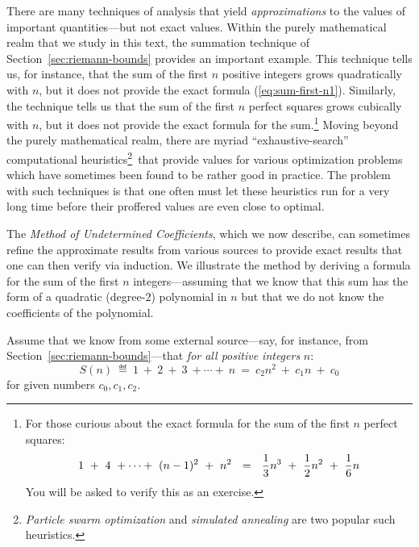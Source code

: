 \medskip


There are many techniques of analysis that yield {\em approximations} to the values of important quantities---but not exact values.  Within the purely mathematical realm that we study in this text, the summation technique of Section~\ref{sec:riemann-bounds} provides an important example.  This technique tells us, for instance, that the sum of the first $n$ positive integers grows quadratically with $n$, but it does not provide the exact formula (\ref{eq:sum-first-n1}).   Similarly, the technique tells us that the sum of the first $n$ perfect squares grows cubically with $n$, but it does not provide the exact formula for the sum.\footnote{For those curious about the exact formula for the sum of the first $n$ perfect squares:
\begin{equation}
\label{eq:sum-1-to-nsq1}
1 \ + \ 4 \ + \cdots + \ (n-1)^2 \ + \ n^2 
 \ \ = \ \
{1 \over 3} n^3 \ + \ {1 \over 2} n^2 \ + \ {1 \over 6} n
\end{equation}
You will be asked to verify this as an exercise.}
Moving beyond the purely mathematical realm, there are myriad ``exhaustive-search'' computational heuristics\footnote{{\it Particle swarm optimization} \cite{KennedyE95} and {\it simulated annealing} \cite{KirkpatrickGV83} are two popular such heuristics.}~that provide values for various optimization problems which have sometimes been found to be rather good in practice.  The problem with such techniques is that one often must let these heuristics run for a very long time before their proffered values are even close to optimal.

\medskip

The {\em Method of Undetermined Coefficients}, which we now describe, can sometimes refine the approximate results from various sources to provide exact results that one can then verify via induction.  We illustrate the method by deriving a formula for the sum of the first $n$ integers---assuming that we know that this sum has the form of a quadratic (degree-$2$) polynomial in $n$ but that we do not know the coefficients of the polynomial.

\smallskip

Assume that we know from some external source---say, for instance, from Section~\ref{sec:riemann-bounds}---that {\em for all positive integers} $n$:
\begin{equation}
\label{eq:formula-for-n}
S(n) \ \eqdef \
 1 \ + \ 2 \ + \ 3 \ + \cdots + \ n 
 \ = \ 
c_2 n^2 \ + \ c_1 n \ + \ c_0
\end{equation}
for given numbers $c_0, c_1, c_2$.

